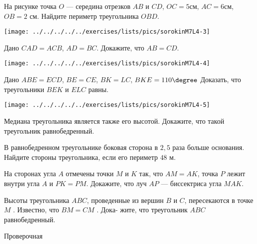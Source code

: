 \begin{class}[number=4]
\begin{listofex}
		\begin{minipage}[t]{\bodywidth}
			На рисунке точка \( O \) --- середина отрезков \( AB \) и \( CD \), \( OC= 5 \)см, \( AC=6 \)см, \( OB =  2 \) см. Найдите периметр треугольника \( OBD \).
		\end{minipage}
		\hspace{0.02\linewidth}
		\begin{minipage}[t]{\picwidth}
			\texttt{[image: ../../../../../exercises/lists/pics/sorokinM7L4-3]}
		\end{minipage}
		\item \begin{minipage}[t]{\bodywidth}
			Дано \( CAD =  ACB \), \( AD = BC \). Докажите, что \( AB = CD \).
		\end{minipage}
		\hspace{0.02\linewidth}
		\begin{minipage}[t]{\picwidth}
			\texttt{[image: ../../../../../exercises/lists/pics/sorokinM7L4-4]}
		\end{minipage}
		\item \begin{minipage}[t]{\bodywidth}
			Дано \(  ABE =  ECD \), \( BE = CE \), \( BK = LC \),  \( BKE= 110\degree \)  Доказать, что треугольники \( BEK \) и \( ELC  \) равны.
		\end{minipage}
		\hspace{0.02\linewidth}
		\begin{minipage}[t]{\picwidth}
			\texttt{[image: ../../../../../exercises/lists/pics/sorokinM7L4-5]}
		\end{minipage}
		\item Медиана треугольника является также его высотой. Докажите, что такой треугольник равнобедренный.
		\item В равнобедренном треугольнике боковая сторона в \( 2,5 \) раза больше основания. Найдите стороны треугольника, если его периметр \( 48  \) м.
		\item На сторонах угла \( A \) отмечены точки \( M \) и \( K \) так, что \( AM = AK \), точка \( P \) лежит внутри угла \( A \) и \( PK = PM \). Докажите, что луч \( AP \) --- биссектриса угла \( MAK \).
		\item Высоты треугольника \( ABC \), проведенные из вершин \( B \)
		и \( C \), пересекаются в точке \( M \) . Известно, что \( BM = CM \) . Дока-
		жите, что треугольник \( ABC \) равнобедренный.
		
		
	\end{listofex}
\end{class}


\begin{exam}
	\begin{listofex}
		\item Проверочная
	\end{listofex}
\end{exam}
